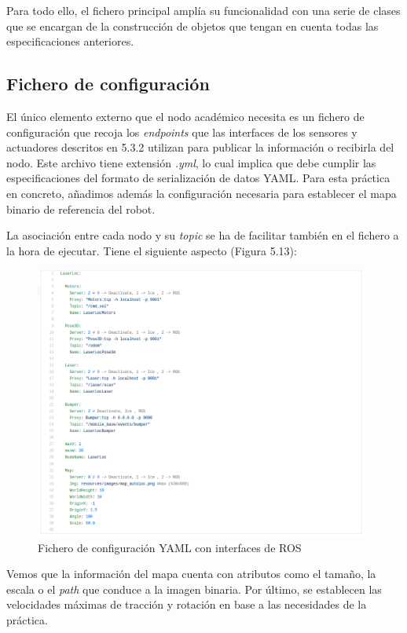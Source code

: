 Para todo ello, el fichero principal amplía su funcionalidad con una serie de clases que se encargan de la construcción de objetos que tengan en cuenta todas las especificaciones anteriores.

\subsection{Fichero de configuración}
El único elemento externo que el nodo académico necesita es un fichero de configuración que recoja los \textit{endpoints} que las interfaces de los sensores y actuadores descritos en 5.3.2 utilizan para publicar la información o recibirla del nodo. Este archivo tiene extensión \textit{.yml}, lo cual implica que debe cumplir las especificaciones del formato de serialización de datos YAML. Para esta práctica en concreto, añadimos además la configuración necesaria para establecer el mapa binario de referencia del robot.

La asociación entre cada nodo y su \textit{topic} se ha de facilitar también en el fichero a la hora de ejecutar. Tiene el siguiente aspecto (Figura 5.13):

\begin{figure}[H]
	\begin{center}
		\includegraphics[width=0.98\textwidth]{figures/llymlfinal.png}
		\caption{Fichero de configuración YAML con interfaces de ROS}
		\label{fig.llymlfinal}
		\end{center}
\end{figure}

Vemos que la información del mapa cuenta con atributos como el tamaño, la escala o el \textit{path} que conduce a la imagen binaria. Por último, se establecen las velocidades máximas de tracción y rotación en base a las necesidades de la práctica. 

